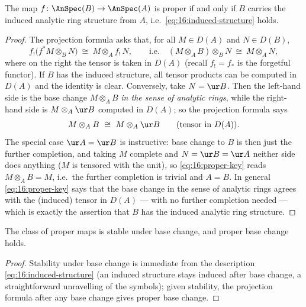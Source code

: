 \begin{proposition}[Properness $=$ inducedness]
\label{prop:16:proper-induced}
The map $f\colon\AnSpec(B)\to\AnSpec(A)$ is proper if and only if $B$ carries the
induced analytic ring structure from $A$, i.e.\ \eqref{eq:16:induced-structure} holds.
\end{proposition}

\begin{proof}
The projection formula asks that, for all $M\in D(A)$ and $N\in D(B)$,
\begin{equation*}
f_!\bigl(f^*M\otimes_B N\bigr)\ \cong\ M\otimes_A f_!\,N,\qquad
\text{i.e.}\quad (M\otimes_A B)\otimes_B N\ \cong\ M\otimes_A N,
\end{equation*}
where on the right the tensor is taken in $D(A)$ (recall $f_!=f_*$ is the forgetful
functor). If $B$ has the induced structure, all tensor products can be computed in
$D(A)$ and the identity is clear. Conversely, take $N=\ur B$. Then the left-hand side
is the base change $M\otimes_A B$ \emph{in the sense of analytic rings}, while the
right-hand side is $M\otimes_A\ur B$ computed in $D(A)$; so the projection formula says
\begin{equation}
\label{eq:16:proper-key}
M\otimes_A B\ \cong\ M\otimes_A\ur B\qquad(\text{tensor in }D(A)).
\end{equation}
The special case $\ur A=\ur B$ is instructive: base change to $B$ is then just the
further completion, and taking $M$ complete and $N=\ur B=\ur A$ neither side does
anything ($M$ is tensored with the unit), so \eqref{eq:16:proper-key} reads $M\otimes_A
B=M$, i.e.\ the further completion is trivial and $A=B$. In general
\eqref{eq:16:proper-key} says that the base change in the sense of analytic rings
agrees with the (induced) tensor in $D(A)$ --- with no further completion needed --- which
is exactly the assertion that $B$ has the induced analytic ring structure.
\end{proof}

\begin{corollary}
\label{cor:16:proper-base-change}
The class of proper maps is stable under base change, and proper base change holds.
\end{corollary}

\begin{proof}
Stability under base change is immediate from the description
\eqref{eq:16:induced-structure} (an induced structure stays induced after base change,
a straightforward unravelling of the symbols); given stability, the projection formula
after any base change gives proper base change.
\end{proof}

